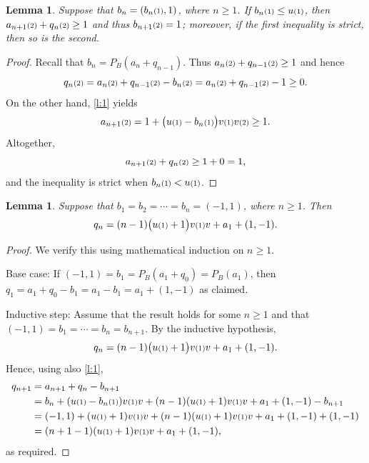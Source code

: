 \documentclass[12pt]{article}
\newtheorem{lemma}[theorem]{Lemma}
\newcommand{\kkk}[1]{\ensuremath{\textstyle\mathsmaller{({#1})}}}
\begin{document}
\begin{lemma}
\label{l:2}
Suppose that $b_n = (b_n\kkk{1},1)$, where $n\geq 1$. 
If $b_n\kkk{1}\leq u\kkk{1}$, 
then $a_{n+1}\kkk{2}+q_n\kkk{2} \geq 1$ and thus $b_{n+1}\kkk{2}=1$; 
moreover, 
if the first inequality is strict, then so is the second.
\end{lemma}
\begin{proof}
Recall that $b_n=P_B(a_n+q_{n-1})$.
Thus 
$a_n\kkk{2}+q_{n-1}\kkk{2}\geq 1$ and
hence
\begin{equation}
q_{n}\kkk{2} = a_{n}\kkk{2}+q_{n-1}\kkk{2}-b_n\kkk{2} =
a_{n}\kkk{2}+q_{n-1}\kkk{2}- 1 \geq 0.
\end{equation}
On the other hand, \cref{l:1} yields
\begin{equation}
a_{n+1}\kkk{2} = 1 + \big(u\kkk{1}-b_n\kkk{1}\big)v\kkk{1}v\kkk{2}\geq 1.
\end{equation}
Altogether, 
\begin{equation}
  a_{n+1}\kkk{2}+q_n\kkk{2} \geq 1+0=1,
\end{equation}
and the inequality is strict when $b_n\kkk{1}<u\kkk{1}$. 
\end{proof}



\begin{lemma}
\label{l:3}
Suppose that 
$b_1=b_2=\cdots=b_n = (-1,1)$, where $n\geq 1$. 
Then 
\begin{equation}
q_n = (n-1)\big(u\kkk{1}+1\big)v\kkk{1}v + a_1+(1,-1).
\end{equation}
\end{lemma}
\begin{proof}
We verify this using mathematical induction on $n\geq 1$.

Base case: If $(-1,1)=b_1 = P_B(a_1+q_0)=P_B(a_1)$, then 
$q_1 = a_1+q_0-b_1 = a_1-b_1 = a_1+(1,-1)$ as claimed.

Inductive step: Assume that the result holds for some $n\geq 1$ 
and that $(-1,1)=b_1=\cdots=b_n=b_{n+1}$.
By the inductive hypothesis,
\begin{equation}
q_n = (n-1)\big(u\kkk{1}+1\big)v\kkk{1}v + a_1+(1,-1).
\end{equation}
Hence, using also \cref{l:1}, 
\begin{subequations}
\begin{align}
q_{n+1} &= a_{n+1}+q_n-b_{n+1}\\
&=
b_n+(u\kkk{1}-b_n\kkk{1})v\kkk{1}v 
+ (n-1)(u\kkk{1}+1)v\kkk{1}v + a_1+(1,-1) - b_{n+1}\\
&=
(-1,1)+(u\kkk{1}+1)v\kkk{1}v 
+ (n-1)(u\kkk{1}+1)v\kkk{1}v + a_1+(1,-1) + (1,-1)\\
&=
(n+1-1)(u\kkk{1}+1)v\kkk{1}v + a_1+(1,-1),
\end{align}
\end{subequations}
as required. 
\end{proof}
\end{document}
